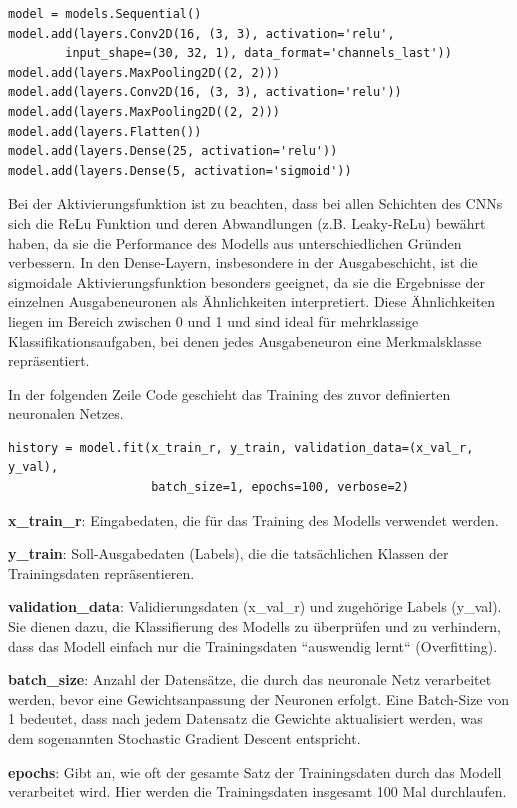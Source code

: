 \begin{verbatim}
model = models.Sequential()
model.add(layers.Conv2D(16, (3, 3), activation='relu', 
		input_shape=(30, 32, 1), data_format='channels_last'))
model.add(layers.MaxPooling2D((2, 2)))
model.add(layers.Conv2D(16, (3, 3), activation='relu'))
model.add(layers.MaxPooling2D((2, 2)))
model.add(layers.Flatten())
model.add(layers.Dense(25, activation='relu'))
model.add(layers.Dense(5, activation='sigmoid'))	
\end{verbatim}

Bei der Aktivierungsfunktion ist zu beachten, dass bei allen Schichten des CNNs sich die ReLu Funktion und deren Abwandlungen (z.B. Leaky-ReLu) bewährt haben, da sie die Performance des Modells aus unterschiedlichen Gründen verbessern. In den Dense-Layern, insbesondere in der Ausgabeschicht, ist die sigmoidale Aktivierungsfunktion besonders geeignet, da sie die Ergebnisse der einzelnen Ausgabeneuronen als Ähnlichkeiten interpretiert. Diese Ähnlichkeiten liegen im Bereich zwischen 0 und 1 und sind ideal für mehrklassige Klassifikationsaufgaben, bei denen jedes Ausgabeneuron eine Merkmalsklasse repräsentiert. \cite{cnn-relu-sigmoid}

In der folgenden Zeile Code geschieht das Training des zuvor definierten neuronalen Netzes.

\begin{verbatim}
history = model.fit(x_train_r, y_train, validation_data=(x_val_r, y_val),
                    batch_size=1, epochs=100, verbose=2)
\end{verbatim}

\begin{mdframed}

\textbf{x\_train\_r}: Eingabedaten, die für das Training des Modells verwendet werden.

\textbf{y\_train}: Soll-Ausgabedaten (Labels), die die tatsächlichen Klassen der Trainingsdaten repräsentieren.

\textbf{validation\_data}: Validierungsdaten (x\_val\_r) und zugehörige Labels (y\_val). Sie dienen dazu, die Klassifierung des Modells zu überprüfen und zu verhindern, dass das Modell einfach nur die Trainingsdaten ``auswendig lernt`` (Overfitting).

\textbf{batch\_size}: Anzahl der Datensätze, die durch das neuronale Netz verarbeitet werden, bevor eine Gewichtsanpassung der Neuronen erfolgt. Eine Batch-Size von 1 bedeutet, dass nach jedem Datensatz die Gewichte aktualisiert werden, was dem sogenannten Stochastic Gradient Descent entspricht.

\textbf{epochs}: Gibt an, wie oft der gesamte Satz der Trainingsdaten durch das Modell verarbeitet wird. Hier werden die Trainingsdaten insgesamt 100 Mal durchlaufen.

\end{mdframed}

